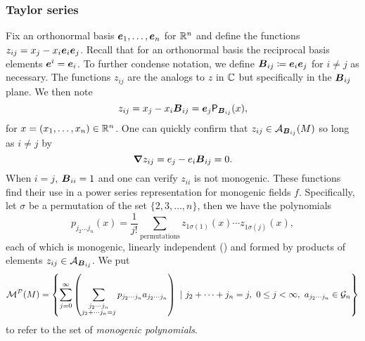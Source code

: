 \subsubsection{Taylor series}
Fix an orthonormal basis $\boldsymbol{e}_1,\dots,\boldsymbol{e}_n$ for $\mathbb{R}^n$ and define the functions $z_{ij} = x_j - x_i \boldsymbol{e}_i \boldsymbol{e}_j$. Recall that for an orthonormal basis the reciprocal basis elements $\boldsymbol{e}^i=\boldsymbol{e}_i$. To further condense notation, we define $\boldsymbol{B}_{ij}\coloneqq \boldsymbol{e}_i \boldsymbol{e}_j$ for $i\neq j$ as necessary. The functions $z_{ij}$ are the analogs to $z$ in $\mathbb{C}$ but specifically in the $\boldsymbol{B}_{ij}$ plane.  We then note
\begin{equation}
z_{ij} = x_j - x_i \boldsymbol{B}_{ij} = \boldsymbol{e}_j\mathsf{P}_{\boldsymbol{B}_{ij}}(x),
\end{equation}
for $x=(x_1,\dots,x_n)\in \mathbb{R}^n$. One can quickly confirm that $z_{ij} \in \mathcal{A}_{\boldsymbol{B}_{ij}}(M)$ so long as $i\neq j$ by
\begin{equation}
\boldsymbol{\nabla} z_{ij} = e_j - e_i \boldsymbol{B}_{ij} = 0.
\end{equation}
When $i=j$, $\boldsymbol{B}_{ii}=1$ and one can verify $z_{ii}$ is not monogenic. These functions find their use in a power series representation for monogenic fields $f$. Specifically, let $\sigma$ be a permutation of the set $\{2,3,\dots,n\}$, then we have the polynomials
\begin{equation}
        p_{j_2 \dots j_n}(x) = \frac{1}{j!} \sum_{\textrm{permutations}}z_{1\sigma(1)}(x) \cdots z_{1\sigma(j)}(x),
\end{equation}
each of which is monogenic, linearly independent (\cite[Proposition 1]{ryan_clifford_2004}) and formed by products of elements $z_{ij} \in \mathcal{A}_{\boldsymbol{B}_{ij}}$. We put
\begin{equation}
    \mathcal{M}^\mathcal{P}(M) = \left\{\sum_{j=0}^\infty \left(\sum_{\substack{{j_2 \cdots j_n} \\ {j_2 + \cdots j_n = j}}}p_{j_2 \cdots j_n}a_{j_2 \cdots j_n}\right) ~\vert~ j_2+\cdots+j_n = j, ~0\leq j < \infty, ~ a_{j_2\cdots j_n} \in \mathcal{G}_n\right\}
\end{equation}
to refer to the set of \emph{monogenic polynomials}. 

